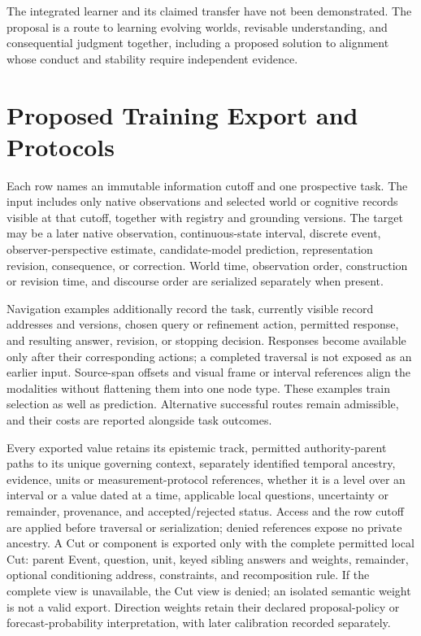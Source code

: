 \documentclass[10pt]{article}
\begin{document}
The integrated learner and its claimed transfer have not been demonstrated.
The proposal is a route to learning evolving worlds, revisable understanding,
and consequential judgment together, including a proposed solution to
alignment whose conduct and stability require independent evidence.

\appendix

\section{Proposed Training Export and Protocols}
\label{app:training-export}

Each row names an immutable information cutoff and one prospective task. The
input includes only native observations and selected world or cognitive records
visible at that cutoff, together with registry and grounding versions. The
target may be a later native observation, continuous-state interval, discrete
event, observer-perspective estimate, candidate-model prediction, representation
revision, consequence, or correction. World time, observation order,
construction or revision time, and discourse order are serialized separately
when present.

Navigation examples additionally record the task, currently visible record
addresses and versions, chosen query or refinement action, permitted response,
and resulting answer, revision, or stopping decision. Responses become
available only after their corresponding actions; a completed traversal is
not exposed as an earlier input. Source-span offsets and visual frame or
interval references align the modalities without flattening them into one
node type. These examples train selection as well as prediction. Alternative
successful routes remain admissible, and their costs are reported alongside
task outcomes.

Every exported value retains its epistemic track, permitted authority-parent
paths to its unique governing context, separately identified temporal ancestry,
evidence, units or measurement-protocol references, whether it is a level over an interval or a
value dated at a time, applicable local questions,
uncertainty or remainder, provenance, and
accepted/rejected status. Access and the row cutoff are applied before
traversal or serialization; denied references expose no private ancestry.
A Cut or component is exported only with the complete permitted local Cut:
parent Event, question, unit, keyed sibling answers and weights, remainder,
optional conditioning address, constraints, and recomposition rule.
If the complete view is unavailable, the Cut view is denied; an isolated
semantic weight is not a valid export. Direction weights retain their
declared proposal-policy or forecast-probability interpretation, with later
calibration recorded separately.
\end{document}
